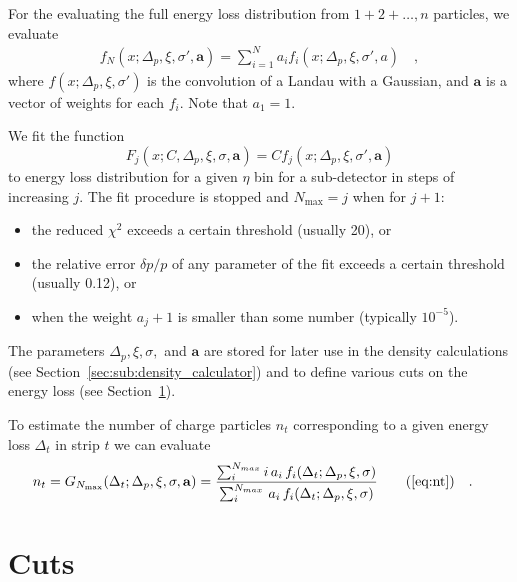 \documentclass[compat,11pt]{alicenote}
\newcommand{\secref}[1]{Section~\ref{#1}}
\begin{document}
For the evaluating the full energy loss distribution from
$1+2+\ldots,n$ particles, we evaluate
\begin{align}
  f_N(x;\Delta_p,\xi,\sigma',\mathbf{a})=\sum_{i=1}^N a_i
  f_i(x;\Delta_p,\xi,\sigma',a)\quad,
\end{align}
where $ f(x;\Delta_p,\xi,\sigma')$ is the convolution of a Landau with
a Gaussian, and $\mathbf{a}$ is a vector of weights for each $
f_i$. Note that $a_1 = 1$.

We fit the function 
$$
F_j(x;C,\Delta_p,\xi,\sigma,\mathbf{a}) = C
f_j(x;\Delta_p,\xi,\sigma',\mathbf{a})
$$
to energy loss distribution for a given $\eta$ bin for a sub-detector
in steps of increasing $j$.  The fit procedure is stopped and
$N_{\text{max}}=j$ when for
$j+1$: 
\begin{itemize}
\item the reduced $\chi^2$ exceeds a certain threshold (usually 20), or
\item the relative error $\delta p/p$ of any parameter of the fit
  exceeds a certain threshold (usually 0.12), or 
\item when the weight $a_j+1$ is smaller than some number (typically
  $10^{-5}$). 
\end{itemize}
The parameters $\Delta_p,\xi,\sigma,$ and $\mathbf{a}$ are stored for
later use in the density calculations (see
\secref{sec:sub:density_calculator}) and to define various cuts on
the energy loss (see \secref{sec:cuts}). 

To estimate the number of charge particles $n_t$ corresponding to a given
energy loss $\Delta_t$ in strip $t$ we can evaluate 
\begin{align}
  n_t &= G_{N_{\text{max}}}(\Delta_t;\Delta_p,\xi,\sigma,\mathbf{a}) =
  \frac{\sum_i^{N_{max}} i\,a_i\,f_i(\Delta_t;\Delta_p,\xi,\sigma)}{
    \sum_i^{N_{max}}\,a_i\,f_i(\Delta_t;\Delta_p,\xi,\sigma)}
  \tag{\ref{eq:nt}}\quad. 
\end{align}

\clearpage
\section{Cuts}
\label{sec:cuts}
\end{document}
